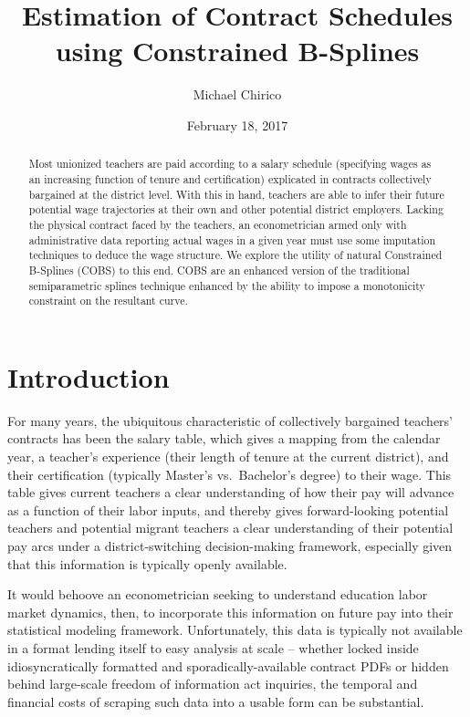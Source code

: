 \documentclass[]{article}
\title{Estimation of Contract Schedules using Constrained B-Splines}
\author{Michael Chirico}
\date{February 18, 2017}
\begin{document}
\maketitle
\begin{abstract}
Most unionized teachers are paid according to a salary schedule
(specifying wages as an increasing function of tenure and certification)
explicated in contracts collectively bargained at the district level.
With this in hand, teachers are able to infer their future potential
wage trajectories at their own and other potential district employers.
Lacking the physical contract faced by the teachers, an econometrician
armed only with administrative data reporting actual wages in a given
year must use some imputation techniques to deduce the wage structure.
We explore the utility of natural Constrained B-Splines (COBS) to this
end. COBS are an enhanced version of the traditional semiparametric
splines technique enhanced by the ability to impose a monotonicity
constraint on the resultant curve.
\end{abstract}

\section{Introduction}\label{introduction}

For many years, the ubiquitous characteristic of collectively bargained
teachers' contracts has been the salary table, which gives a mapping
from the calendar year, a teacher's experience (their length of tenure
at the current district), and their certification (typically Master's
vs.~Bachelor's degree) to their wage. This table gives current teachers
a clear understanding of how their pay will advance as a function of
their labor inputs, and thereby gives forward-looking potential teachers
and potential migrant teachers a clear understanding of their potential
pay arcs under a district-switching decision-making framework,
especially given that this information is typically openly available.

It would behoove an econometrician seeking to understand education labor
market dynamics, then, to incorporate this information on future pay
into their statistical modeling framework. Unfortunately, this data is
typically not available in a format lending itself to easy analysis at
scale -- whether locked inside idiosyncratically formatted and
sporadically-available contract PDFs or hidden behind large-scale
freedom of information act inquiries, the temporal and financial costs
of scraping such data into a usable form can be substantial.
\end{document}
